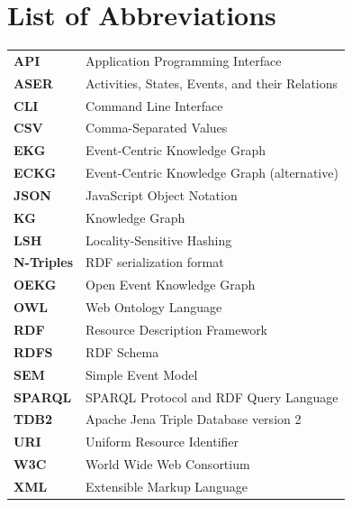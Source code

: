 \section*{List of Abbreviations}

\begin{tabular}{ll}
\textbf{API} & Application Programming Interface \\
\textbf{ASER} & Activities, States, Events, and their Relations \\
\textbf{CLI} & Command Line Interface \\
\textbf{CSV} & Comma-Separated Values \\
\textbf{EKG} & Event-Centric Knowledge Graph \\
\textbf{ECKG} & Event-Centric Knowledge Graph (alternative) \\
\textbf{JSON} & JavaScript Object Notation \\
\textbf{KG} & Knowledge Graph \\
\textbf{LSH} & Locality-Sensitive Hashing \\
\textbf{N-Triples} & RDF serialization format \\
\textbf{OEKG} & Open Event Knowledge Graph \\
\textbf{OWL} & Web Ontology Language \\
\textbf{RDF} & Resource Description Framework \\
\textbf{RDFS} & RDF Schema \\
\textbf{SEM} & Simple Event Model \\
\textbf{SPARQL} & SPARQL Protocol and RDF Query Language \\
\textbf{TDB2} & Apache Jena Triple Database version 2 \\
\textbf{URI} & Uniform Resource Identifier \\
\textbf{W3C} & World Wide Web Consortium \\
\textbf{XML} & Extensible Markup Language \\
\end{tabular}
